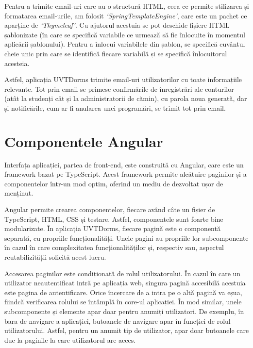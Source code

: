 \documentclass[12pt,a4paper]{report}
\theoremstyle{definition}
\theoremstyle{remark}
\begin{document}
\par Pentru a trimite email-uri care au o structură HTML, ceea ce permite stilizarea și formatarea email-urile, am folosit \textit{`SpringTemplateEngine'}, care este un pachet ce aparține de \textit{`Thymeleaf'}. Cu ajutorul acestuia se pot deschide fișiere HTML șablonizate (în care se specifică variabile ce urmează să fie înlocuite în momentul aplicării șablonului). Pentru a înlocui variabilele din șablon, se specifică cuvântul cheie unic prin care se identifică fiecare variabilă și se specifică înlocuitorul acesteia\cite{template_engine_for_spring_boot}.

\par Astfel, aplicația UVTDorms trimite email-uri utilizatorilor cu toate informațiile relevante. Tot prin email se primesc confirmările de înregistrări ale conturilor (atât la studenți cât și la administratorii de cămin), cu parola noua generată, dar și notificările, cum ar fi anularea unei programări, se trimit tot prin email.

\section{Componentele Angular}

\par Interfața aplicației, partea de front-end, este construită cu Angular, care este un framework bazat pe TypeScript\cite{geetha2022interpretation}. Acest framework permite alcătuire paginilor și a componentelor într-un mod optim, oferind un mediu de dezvoltat ușor de menținut.

\par Angular permite crearea componentelor, fiecare având câte un fișier de TypeScript, HTML, CSS și testare. Astfel, componentele sunt foarte bine modularizate. În aplicația UVTDorms, fiecare pagină este o componentă separată, cu propriile \textnormal{func\-ți\-o\-na\-li\-tă\-ți}. Unele pagini au propriile lor subcomponente în cazul în care complexitatea \textnormal{func\-ți\-o\-na\-li\-tă\-ți\-lor} și, respectiv sau, aspectul reutabilizității solicită acest lucru.

\par Accesarea paginilor este condiționată de rolul utilizatorului. În cazul în care un utilizator neautentificat intră pe aplicația web, singura pagină accesibilă acestuia este pagina de autentificare. Orice încercare de a intra pe o altă pagină va eșua, fiindcă verificarea rolului se întâmplă în core-ul aplicației. În mod similar, unele subcomponente și elemente apar doar pentru anumiți utilizatori. De exemplu, în bara de navigare a aplicației, butoanele de navigare apar în funcției de rolul utilizatorului. Astfel, pentru un anumit tip de utilizator, apar doar butoanele care duc la paginile la care utilizatorul are acces.
\end{document}
